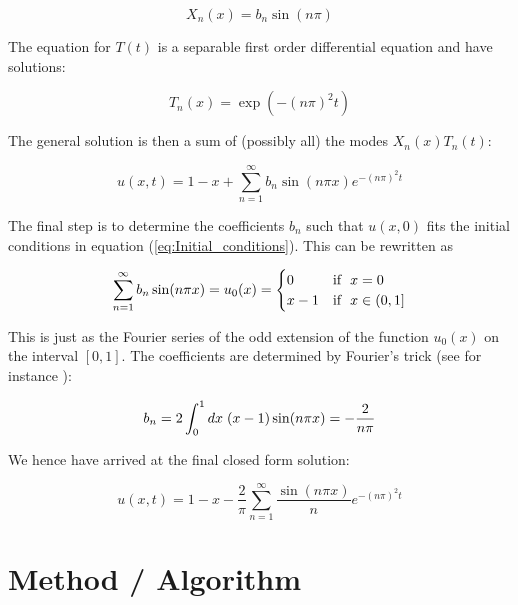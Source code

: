 \documentclass[a4paper, 11pt, notitlepage,english]{article}
\begin{document}
\begin{equation}
X_n(x) = b_n \sin(n\pi)
\label{eq:Separated_X_solution}
\end{equation}

The equation for $T(t)$ is a separable first order differential equation and have solutions:

\begin{equation}
T_n(x) = \exp(-(n\pi)^2t)
\label{eq:Separated_T_solution}
\end{equation}

The general solution is then a sum of (possibly all) the modes $X_n(x)T_n(t)$:

\begin{equation}
u(x,t) = 1-x +\sum_{n=1}^{\infty} b_n \sin(n\pi x) e^{-(n\pi)^2t}
\label{eq:General_solution}
\end{equation}

The final step is to determine the coefficients $b_n$ such that $u(x,0)$ fits the initial conditions in equation (\ref{eq:Initial_conditions}). This can be rewritten as 

\begin{equation}
\sum_{n=1}^{\infty} b_n \sin(n\pi x) = u_0(x) =  \begin{cases} 0 & \mathrm{if} \hspace{2mm} x = 0 \\
x-1 & \mathrm{if} \hspace{2mm} x \in (0,1] \end{cases}
\label{eq:Initial_cond_fit}
\end{equation}

This is just as the Fourier series of the odd extension of the function $u_0(x)$ on the interval $[0,1]$. The coefficients are determined by Fourier's trick (see for instance \cite{Boas}):

\begin{equation}
b_n = 2\int_0^1 dx \hspace{1mm} (x-1) \sin(n\pi x) = -\frac{2}{n\pi}
\label{eq:Fourier_trick}
\end{equation}

We hence have arrived at the final closed form solution:

\begin{equation}
u(x,t) = 1-x - \frac{2}{\pi} \sum_{n=1}^{\infty} \frac{\sin(n\pi x)}{n} e^{-(n\pi)^2t}
\label{eq:Final_solution}
\end{equation}

\section{Method / Algorithm}
\end{document}
